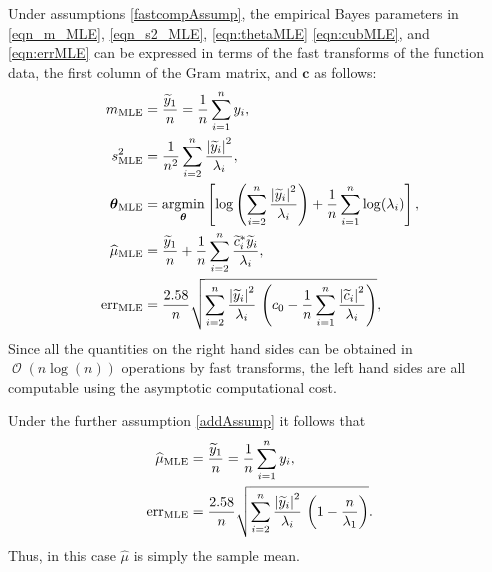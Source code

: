 \documentclass{iitthesis}          %
\DeclareMathOperator{\Order}{{\mathcal O}}
\newcommand{\bm}[1]{\boldsymbol{#1}}
\newcommand{\vtheta}{{\bm{\theta}}}
\newcommand{\vc}{\bm{c}}
\newcommand{\hmu}{\widehat{\mu}}
\newcommand{\MLE}{\textup{MLE}}
\newcommand{\err}{\textup{err}}
\def\abs#1{\ensuremath{\left \lvert #1 \right \rvert}}
\providecommand{\argmin}{\operatorname*{argmin}}
\begin{document}
Under assumptions \eqref{fastcompAssump}, the empirical Bayes parameters in \eqref{eqn_m_MLE}, \eqref{eqn_s2_MLE}, \eqref{eqn:thetaMLE} \eqref{eqn:cubMLE}, and \eqref{eqn:errMLE} can be expressed in terms of the fast transforms of the function data, the first column of the Gram matrix, and $\vc$ as follows:
\begin{align}
\nonumber
m_\MLE &=  \frac{\widetilde{y}_1}{n} = \frac 1n \sum_{i=1}^n y_i,
\\
\nonumber
s^2_\MLE 
& =
\frac{1}{n^2} 
\sum_{i=2}^n \frac{\abs{\widetilde{y}_i}^2}{\lambda_i}, \\
\label{eqn_MLE_loss_func_optimized_2}
\vtheta_\MLE
&= 
\argmin_{\vtheta}
\left[
\log\left(
\sum_{i=2}^n \frac{\abs{\widetilde{y}_i}^2}{\lambda_i}
\right)   + 
\frac{1}{n}\sum_{i=1}^n \log(\lambda_i)
\right],
\\
\nonumber
\hmu_\MLE  &= 
\frac{\widetilde{y}_1}{n} +
\frac 1n \sum_{i=2}^n \frac{ \widetilde{c}_i^* \widetilde{y}_i}{\lambda_i}, \\
\nonumber
\err_\MLE  &
=
\frac{2.58}{n}\sqrt{
	\sum_{i=2}^{n} \frac{\abs{\widetilde{y}_i}^2}{\lambda_i}  
	\,
	\left( c_0 - \frac 1n \sum_{i=1}^n \frac{\abs{\widetilde{c}_i}^2}{\lambda_i} \right) 
},
\end{align}
Since all the quantities on the right hand sides can be obtained in $\Order(n \log(n))$ operations by fast transforms, the left hand sides are all computable using the asymptotic computational cost.

Under the further assumption \eqref{addAssump} it follows that 
\begin{align}
\nonumber
\hmu_\MLE  &= 
\frac{\widetilde{y}_1}{n} = \frac 1n \sum_{i=1}^n y_i,\\
\label{eq:errMLEAllAsump}
\err_\MLE  &
=
\frac{2.58}{n}\sqrt{
	\sum_{i=2}^{n} \frac{\abs{\widetilde{y}_i}^2}{\lambda_i}  
	\,
	\left( 1 -  \frac{n}{\lambda_1} \right) 
}.
\end{align}
Thus, in this  case $\hmu$ is simply the sample mean.
\end{document}
